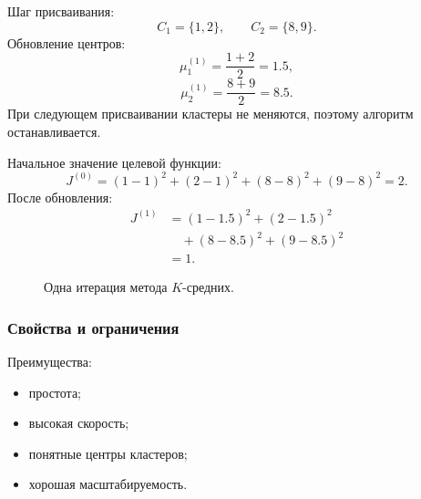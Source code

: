 \documentclass[12pt,a4paper]{article}
\theoremstyle{definition}
\theoremstyle{remark}
\begin{document}
Шаг присваивания:
\[
    C_1=\{1,2\},
    \qquad
    C_2=\{8,9\}.
\]
Обновление центров:
\[
    \mu_1^{(1)}
    =
    \frac{1+2}{2}
    =
    1.5,
\]
\[
    \mu_2^{(1)}
    =
    \frac{8+9}{2}
    =
    8.5.
\]
При следующем присваивании кластеры не меняются, поэтому алгоритм
останавливается.

Начальное значение целевой функции:
\[
    J^{(0)}
    =
    (1-1)^2+(2-1)^2+(8-8)^2+(9-8)^2
    =
    2.
\]
После обновления:
\[
\begin{split}
    J^{(1)}
    &=
    (1-1.5)^2+(2-1.5)^2\\
    &\quad+
    (8-8.5)^2+(9-8.5)^2\\
    &=1.
\end{split}
\]

\begin{figure}[ht]
\centering
{}
\caption{Одна итерация метода $K$-средних.}
\end{figure}

\subsubsection{Свойства и ограничения}

Преимущества:

\begin{itemize}
    \item простота;
    \item высокая скорость;
    \item понятные центры кластеров;
    \item хорошая масштабируемость.
\end{itemize}
\end{document}
